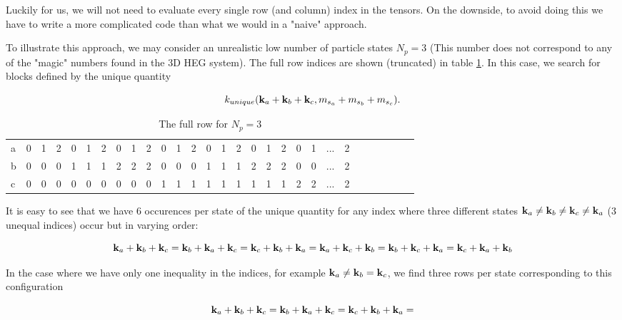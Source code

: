 Luckily for us, we will not need to evaluate every single row (and column) index in the tensors. On the downside, to avoid doing this we have to write a more complicated code than what we would in a "naive" approach. 

To illustrate this approach, we may consider an unrealistic low number of particle states $N_p = 3$ (This number does not correspond to any of the "magic" numbers found in the 3D HEG system). The full row indices are shown (truncated) in table \ref{tab:np3}. In this case, we search for blocks defined by the unique quantity

\begin{equation}
k_{unique}(\bold{k}_a + \bold{k}_b + \bold{k}_c, m_{s_a} + m_{s_b} +  m_{s_c}).
\end{equation}

\begin{table}[]
\centering
\caption{The full row for $N_p = 3$ }
\label{tab:np3}
\begin{tabular}{lllllllllllllllllllllllllllll}
a &0&  1&  2&  0&  1&  2&  0&  1&  2&  0&  1&  2&  0&  1&  2&  0&  1&  2& 0&  1& ... &  2& \\
b & 0&  0&  0&  1&  1&  1&  2&  2&  2&  0&  0&  0&  1&  1&  1&  2&  2&  2& 0&  0&  ... &  2& \\
c & 0&  0&  0&  0&  0&  0&  0&  0&  0&  1&  1&  1&  1&  1&  1&  1&  1&  1& 2&  2& ... &  2& \\
\end{tabular}
\end{table}

It is easy to see that we have 6 occurences per state of the unique quantity for any index where three different states $\bold{k}_a \neq \bold{k}_b \neq \bold{k}_c \neq \bold{k}_a$ (3 unequal indices) occur but in varying order:

\begin{equation}
\bold{k}_a + \bold{k}_b + \bold{k}_c = 
\bold{k}_b + \bold{k}_a + \bold{k}_c = 
\bold{k}_c + \bold{k}_b + \bold{k}_a = 
\bold{k}_a + \bold{k}_c + \bold{k}_b =
\bold{k}_b + \bold{k}_c + \bold{k}_a =
\bold{k}_c + \bold{k}_a + \bold{k}_b
\end{equation}

In the case where we have only one inequality in the indices, for example $\bold{k}_a \neq \bold{k}_b = \bold{k}_c$, we find three rows per state corresponding to this configuration

\begin{equation}
\bold{k}_a + \bold{k}_b + \bold{k}_c = 
\bold{k}_b + \bold{k}_a + \bold{k}_c = 
\bold{k}_c + \bold{k}_b + \bold{k}_a = 
\end{equation}


